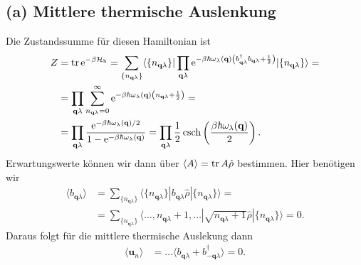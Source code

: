 \documentclass[english, parskip=full]{scrartcl}
\renewcommand{\bra}{}
\newcommand{\kla}{}
\newcommand{\tecxt}{}
\newcommand{\e}{\text{e}}
\begin{document}
\subsection*{(a) Mittlere thermische Auslenkung}
Die Zustandssumme für diesen Hamiltonian ist
\begin{align}
Z &= \tecxt\text{tr\,} \e^{-\beta \mathcal{H}_\tecxt\text{h}} = \sum_{\{n_{\textbf{q} \lambda}\}} \langle \{ n_{\textbf{q} \lambda}\} | \prod_{\textbf{q} \lambda} \e^{-\beta\hbar\omega_\lambda (\textbf{q}) \kla\left( b^\dagger_{\textbf{q} \lambda} b_{\textbf{q} \lambda} + \frac{1}{2} \right)} | \{n_{\textbf{q} \lambda}\} \rangle = \\
&= \prod_{\textbf{q} \lambda} \sum_{n_{\textbf{q} \lambda} = 0}^\infty  \e^{-\beta\hbar\omega_\lambda (\textbf{q}) \kla\left( n_{\textbf{q} \lambda} + \frac{1}{2} \right)} = \\
&= \prod_{\textbf{q} \lambda} \frac{\e^{-\beta\hbar\omega_\lambda (\textbf{q}) / 2}}{1 - \e^{-\beta\hbar\omega_\lambda (\textbf{q})}} = \prod_{\textbf{q} \lambda} \frac{1}{2} \csch\kla\left( \frac{\beta\hbar\omega_\lambda (\textbf{q})}{2} \right).
\end{align}
Erwartungswerte können wir dann über $\bra\langle A \rangle = \tecxt\text{tr\,}A\hat{\rho}$ bestimmen.
Hier benötigen wir
\begin{align}
\bra\langle b_{\textbf{q} \lambda} \rangle &= \sum_{\{n_{\textbf{q} \lambda}\}} \langle \{ n_{\textbf{q} \lambda}\} | b_{\textbf{q} \lambda} \hat{\rho} | \{n_{\textbf{q} \lambda}\} \rangle = \\
&= \sum_{\{n_{\textbf{q} \lambda}\}} \langle \dots, n_{\textbf{q} \lambda} + 1, \dots | \sqrt{n_{\textbf{q} \lambda} + 1} \hat{\rho} | \{n_{\textbf{q} \lambda}\} \rangle = 0.
\end{align}
Daraus folgt für die mittlere thermische Auslekung dann
\begin{align}
\bra\langle \textbf{u}_n \rangle &= \dots \bra\langle b_{\textbf{q} \lambda} + b^\dagger_{-\textbf{q} \lambda} \rangle = 0.
\end{align}
\end{document}
